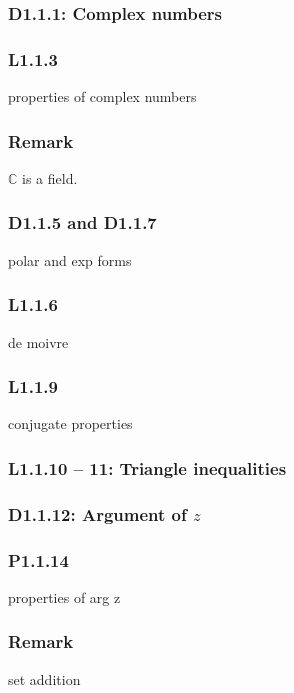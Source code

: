 \documentclass{article}
\begin{document}
\begin{multicols*}{3}
\noindent

\subsubsection*{D1.1.1: Complex numbers}

\subsubsection*{L1.1.3}
properties of complex numbers

\subsubsection*{Remark}
$\mathbb{C}$ is a field.

\subsubsection*{D1.1.5 and D1.1.7}
polar and exp forms

\subsubsection*{L1.1.6}
de moivre

\subsubsection*{L1.1.9}
conjugate properties

\subsubsection*{L1.1.10 -- 11: Triangle inequalities}

\subsubsection*{D1.1.12: Argument of $z$}

\subsubsection*{P1.1.14}
properties of arg z

\subsubsection*{Remark}
set addition


\end{multicols*}
\end{document}
